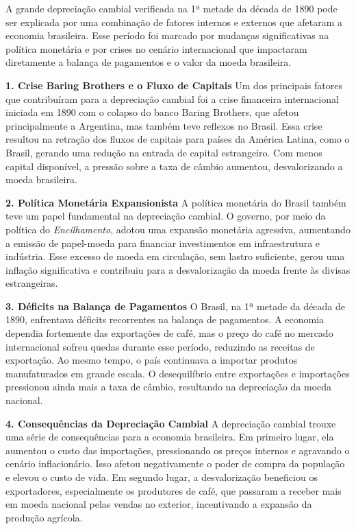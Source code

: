 \documentclass[a4paper,12pt]{article}[abntex2]
\begin{document}
A grande depreciação cambial verificada na 1ª metade da década de 1890 pode ser explicada por uma combinação de fatores internos e externos que afetaram a economia brasileira. Esse período foi marcado por mudanças significativas na política monetária e por crises no cenário internacional que impactaram diretamente a balança de pagamentos e o valor da moeda brasileira.

\textbf{1. Crise Baring Brothers e o Fluxo de Capitais}
Um dos principais fatores que contribuíram para a depreciação cambial foi a crise financeira internacional iniciada em 1890 com o colapso do banco Baring Brothers, que afetou principalmente a Argentina, mas também teve reflexos no Brasil. Essa crise resultou na retração dos fluxos de capitais para países da América Latina, como o Brasil, gerando uma redução na entrada de capital estrangeiro. Com menos capital disponível, a pressão sobre a taxa de câmbio aumentou, desvalorizando a moeda brasileira.

\textbf{2. Política Monetária Expansionista}
A política monetária do Brasil também teve um papel fundamental na depreciação cambial. O governo, por meio da política do \textit{Encilhamento}, adotou uma expansão monetária agressiva, aumentando a emissão de papel-moeda para financiar investimentos em infraestrutura e indústria. Esse excesso de moeda em circulação, sem lastro suficiente, gerou uma inflação significativa e contribuiu para a desvalorização da moeda frente às divisas estrangeiras.

\textbf{3. Déficits na Balança de Pagamentos}
O Brasil, na 1ª metade da década de 1890, enfrentava déficits recorrentes na balança de pagamentos. A economia dependia fortemente das exportações de café, mas o preço do café no mercado internacional sofreu quedas durante esse período, reduzindo as receitas de exportação. Ao mesmo tempo, o país continuava a importar produtos manufaturados em grande escala. O desequilíbrio entre exportações e importações pressionou ainda mais a taxa de câmbio, resultando na depreciação da moeda nacional.

\textbf{4. Consequências da Depreciação Cambial}
A depreciação cambial trouxe uma série de consequências para a economia brasileira. Em primeiro lugar, ela aumentou o custo das importações, pressionando os preços internos e agravando o cenário inflacionário. Isso afetou negativamente o poder de compra da população e elevou o custo de vida. Em segundo lugar, a desvalorização beneficiou os exportadores, especialmente os produtores de café, que passaram a receber mais em moeda nacional pelas vendas no exterior, incentivando a expansão da produção agrícola.
\end{document}
